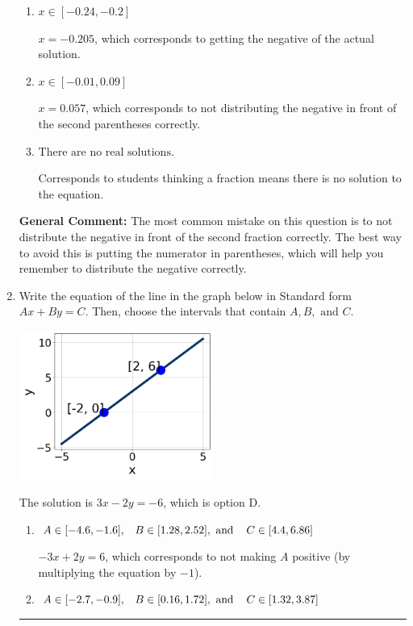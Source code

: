 \documentclass{extbook}[14pt]
\newcommand{\litem}[1]{\item #1

\rule{\textwidth}{0.4pt}}
\begin{document}
\begin{enumerate}
{\begin{enumerate}[label=\Alph*.]
* $x = -0.440$, which is the correct option.
\item \( x \in [-0.24, -0.2] \)

$x = -0.205$, which corresponds to getting the negative of the actual solution.
\item \( x \in [-0.01, 0.09] \)

$x = 0.057$, which corresponds to not distributing the negative in front of the second parentheses correctly.
\item \( \text{There are no real solutions.} \)

Corresponds to students thinking a fraction means there is no solution to the equation.
\end{enumerate}

\textbf{General Comment:} The most common mistake on this question is to not distribute the negative in front of the second fraction correctly. The best way to avoid this is putting the numerator in parentheses, which will help you remember to distribute the negative correctly.
}
\litem{
Write the equation of the line in the graph below in Standard form $Ax+By=C$. Then, choose the intervals that contain $A, B, \text{ and } C$.

\begin{center}
    \includegraphics[width=0.5\textwidth]{../Figures/linearGraphToStandardB.png}
\end{center}



The solution is \( 3x - 2y = -6 \), which is option D.\begin{enumerate}[label=\Alph*.]
\item \( A \in [-4.6, -1.6], \hspace{3mm} B \in [1.28, 2.52], \text{ and } \hspace{3mm} C \in [4.4, 6.86] \)

 $-3x + 2y = 6$, which corresponds to not making $A$ positive (by multiplying the equation by $-1$).
\item \( A \in [-2.7, -0.9], \hspace{3mm} B \in [0.16, 1.72], \text{ and } \hspace{3mm} C \in [1.32, 3.87] \)


\end{enumerate}}
\end{enumerate}
\end{document}
